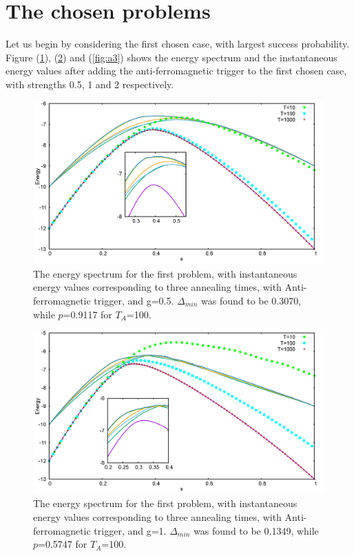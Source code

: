 \documentclass[12]{article}
\begin{document}
\section*{The chosen problems}
Let us begin by considering the first chosen case, with largest success probability. 
Figure (\ref{fig:a1}), (\ref{fig:a2}) and (\ref{fig:a3}) shows the energy spectrum and the instantaneous energy values after adding the anti-ferromagnetic trigger to the first chosen case, with strengths 0.5, 1 and 2 respectively.
\begin{figure}[H]
\centering 
\includegraphics[scale=0.3]{733_s12_A_g0.png}
\caption{The energy spectrum for the first problem, with instantaneous energy values corresponding to three annealing times, with Anti-ferromagnetic trigger, and g=0.5. $\Delta_{min}$ was found to be 0.3070, while $p$=0.9117 for $T_A$=100. }
\label{fig:a1}
\end{figure}
\begin{figure}[H]
\centering 
\includegraphics[scale=0.3]{733_s12_A_g1.png}
\caption{The energy spectrum for the first problem, with instantaneous energy values corresponding to three annealing times, with Anti-ferromagnetic trigger, and g=1. $\Delta_{min}$ was found to be 0.1349, while $p$=0.5747 for $T_A$=100. }
\label{fig:a2}
\end{figure}
\end{document}
